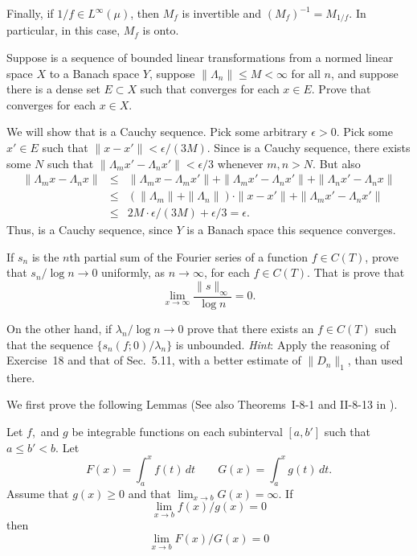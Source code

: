 \begin{enumerate}
Finally, if \(1/f \in L^\infty(\mu)\), then 
\(M_f\) is invertible and \((M_f)^{-1} = M_{1/f}\).
In particular, in this case, \(M_f\) is onto.

\begin{excopy}
Suppose  is a sequence of bounded linear transformations
from a normed linear space $X$ to a Banach space $Y$,
suppose \(\|\Lambda_n\| \leq M <\infty\) for all $n$, and suppose
there is a dense set \(E\subset X\) such that
 converges for each \(x\in E\).
Prove that  converges for each \(x\in X\).
\end{excopy}

We will show that  is a Cauchy sequence.
Pick some arbitrary \(\epsilon>0\). Pick some \(x'\in E\) such that
\(\|x-x'\|<\epsilon/(3M)\).
Since  is a Cauchy sequence, there exists
some $N$ such that \(\|\Lambda_m x' - \Lambda_n x'\| < \epsilon/3\)
whenever \(m,n>N\). But also
\begin{eqnarray*}
\|\Lambda_m x - \Lambda_n x\|
&\leq&
 \|\Lambda_m x - \Lambda_m x'\|
 + \|\Lambda_m x' - \Lambda_n x'\|
 + \|\Lambda_n x' - \Lambda_n x\| \\
&\leq& (\|\Lambda_m\| + \|\Lambda_n\|)\cdot\|x-x'\| 
      + \|\Lambda_m x' - \Lambda_n x'\| \\
&\leq& 2M\cdot\epsilon/(3M) + \epsilon/3 = \epsilon.
\end{eqnarray*}
Thus,  is a Cauchy sequence, 
since $Y$ is a Banach space this sequence converges.


\begin{excopy}
If \(s_n\) is the $n$th partial sum of the Fourier series of a function
\(f\in C(T)\), prove that \(s_n/\log n \to 0\)
uniformly, as \(n\to \infty\), for each \(f\in C(T)\). That is prove that
\[ \lim_{x\to\infty} \frac{\|s\|_\infty}{\log n} = 0. \]

On the other hand, if \(\lambda_n/\log n \to 0\) prove that there exists an
\(f\in C(T)\) such that the sequence \(\{s_n(f;0)/\lambda_n\}\) is unbounded.
\emph{Hint}: Apply the reasoning of Exercise~18 and that of Sec.~5.11,
with a better estimate of \(\|D_n\|_1\), than used there.
\end{excopy}

We first prove the following Lemmas
(See also Theorems~I-8-1 and II-8-13 in \cite{Zyg:2002}).

\begin{llem} \label{llem:fog:ifoig}
Let $f$,\ and $g$ be integrable functions on each 
subinterval \([a,b']\) such that \(a\leq b' < b\).
Let
\begin{equation*}
F(x) = \int_a^x f(t)\,dt
\qquad
G(x) = \int_a^x g(t)\,dt.
\end{equation*}
Assume that \(g(x)\geq 0\) and that \(\lim_{x\to b} G(x) = \infty\).
If 
\begin{equation*}
\lim_{x\to b} f(x)/g(x) = 0
\end{equation*}
then
\begin{equation*}
\lim_{x\to b} F(x)/G(x) = 0
\end{equation*}
\end{llem}


\end{enumerate}
